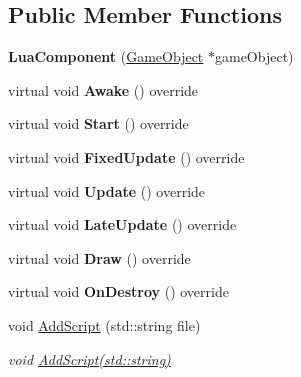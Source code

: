 \subsection*{Public Member Functions}
\begin{DoxyCompactItemize}
\item 
\mbox{\label{classrvl_1_1_lua_component_a6b14ff45a5261ad992475cd4653a522e}} 
{\bfseries Lua\+Component} (\hyperlink{classrvl_1_1_game_object}{Game\+Object} $\ast$game\+Object)
\item 
\mbox{\label{classrvl_1_1_lua_component_a58c701adc9a87c9e95cdd49e73dcfea7}} 
virtual void {\bfseries Awake} () override
\item 
\mbox{\label{classrvl_1_1_lua_component_afab369167ed4efa56e539ed6a3f137b8}} 
virtual void {\bfseries Start} () override
\item 
\mbox{\label{classrvl_1_1_lua_component_a95af241ebc22f86aa101f3c91551bd93}} 
virtual void {\bfseries Fixed\+Update} () override
\item 
\mbox{\label{classrvl_1_1_lua_component_a5bccf3aa4a894c64cb671d2193fa533a}} 
virtual void {\bfseries Update} () override
\item 
\mbox{\label{classrvl_1_1_lua_component_ab1324950b46f2d77b87ec0a5047e3e7e}} 
virtual void {\bfseries Late\+Update} () override
\item 
\mbox{\label{classrvl_1_1_lua_component_a7087bc76dbf540ba119eb81300300c5a}} 
virtual void {\bfseries Draw} () override
\item 
\mbox{\label{classrvl_1_1_lua_component_a762e6f493e16c61a4fd02324769466ee}} 
virtual void {\bfseries On\+Destroy} () override
\item 
void \hyperlink{classrvl_1_1_lua_component_a677b4674695a2455b2e23f0310884d82}{Add\+Script} (std\+::string file)
\begin{DoxyCompactList}\small\item\em void \hyperlink{classrvl_1_1_lua_component_a677b4674695a2455b2e23f0310884d82}{Add\+Script(std\+::string)} \end{DoxyCompactList}\end{DoxyCompactItemize}
